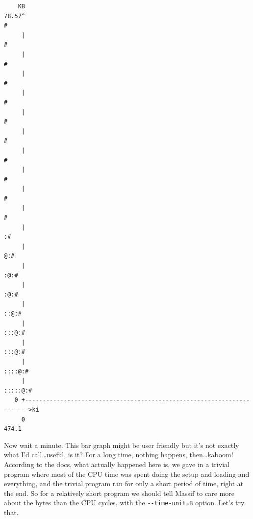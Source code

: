 \documentclass[a4paper]{report}
\begin{document}
{\scriptsize
\begin{verbatim}
    KB
78.57^                                                                       #
     |                                                                       #
     |                                                                       #
     |                                                                       #
     |                                                                       #
     |                                                                       #
     |                                                                       #
     |                                                                       #
     |                                                                       #
     |                                                                       #
     |                                                                       #
     |                                                                      :#
     |                                                                     @:#
     |                                                                    :@:#
     |                                                                    :@:#
     |                                                                   ::@:#
     |                                                                  :::@:#
     |                                                                  :::@:#
     |                                                                 ::::@:#
     |                                                                :::::@:#
   0 +----------------------------------------------------------------------->ki
     0                                                                   474.1
\end{verbatim}
}

Now wait a minute. This bar graph might be user friendly but it's not exactly what I'd call\ldots useful, is it? For a long time, nothing happens, then\ldots kaboom! According to the docs, what actually happened here is, we gave in a trivial program where most of the CPU time was spent doing the setup and loading and everything, and the trivial program ran for only a short period of time, right at the end. So for a relatively short program we should tell Massif to care more about the bytes than the CPU cycles, with the \verb+--time-unit=B+ option. Let's try that.
\end{document}
